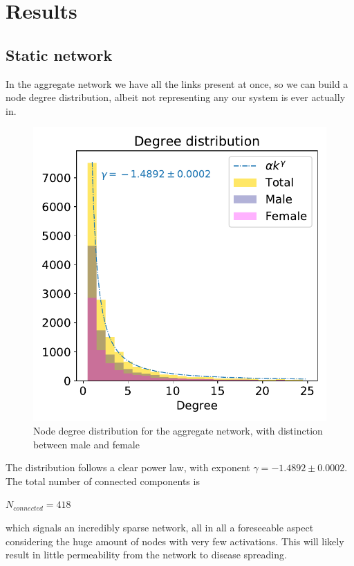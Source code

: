 \documentclass[a4paper,11pt, twocolumn]{article}
\begin{document}
\section{Results}
\subsection{Static network}
In the aggregate network we have all the links present at once, so we can build a node degree distribution, albeit not representing any our system is ever actually in.
\begin{figure}[H]
\centering
\includegraphics[scale=0.3]{./Figure/Static/Degree_distribution.pdf}
\caption{Node degree distribution for the aggregate network, with distinction between male and female}
\end{figure}
The distribution follows a clear power law, with exponent $\gamma = -1.4892 \pm 0.0002 $.
The total number of connected components is 
\begin{center}
    $N_{connected} = 418$
\end{center}{}
which signals an incredibly sparse network, all in all a foreseeable aspect considering the huge amount of nodes with very few activations. This will likely result in little permeability from the network to disease spreading.
\end{document}

